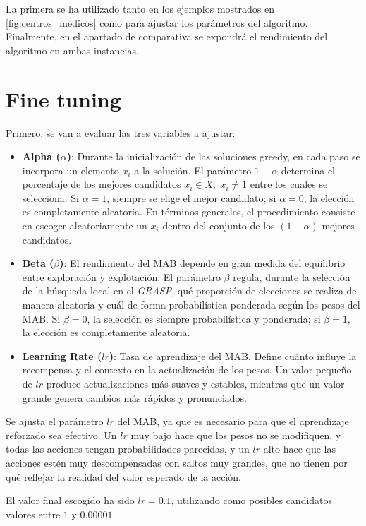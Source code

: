 \documentclass[12pt,a4paper]{book}
\begin{document}
La primera se ha utilizado tanto en los ejemplos mostrados en \ref{fig:centros_medicos} como para ajustar los parámetros del algoritmo. Finalmente, en el apartado de comparativa
se expondrá el rendimiento del algoritmo en ambas instancias.

\section{Fine tuning}

Primero, se van a evaluar las tres variables a ajustar:
\begin{itemize}
    \item \textbf{Alpha ($\alpha$)}: Durante la inicialización de las soluciones greedy, en cada paso se incorpora un elemento $x_i$ a la solución. El parámetro $1-\alpha$ determina el porcentaje de los mejores candidatos $x_i \in X, \; x_i \neq 1$ entre los cuales se selecciona.  
Si $\alpha = 1$, siempre se elige el mejor candidato; si $\alpha = 0$, la elección es completamente aleatoria. En términos generales, el procedimiento consiste en escoger aleatoriamente un $x_i$ dentro del conjunto de los $(1-\alpha)$ mejores candidatos.
    \item \textbf{Beta ($\beta$)}: El rendimiento del MAB depende en gran medida del equilibrio entre exploración y explotación. El parámetro $\beta$ regula, durante la selección de la búsqueda local en el \textit{GRASP}, qué proporción de elecciones se realiza de manera aleatoria y cuál de forma probabilística ponderada según los pesos del MAB.  
Si $\beta = 0$, la selección es siempre probabilística y ponderada; si $\beta = 1$, la elección es completamente aleatoria.
    \item \textbf{Learning Rate ($lr$)}: Tasa de aprendizaje del MAB. Define cuánto influye la recompensa y el contexto en la actualización de los pesos. 
Un valor pequeño de $lr$ produce actualizaciones más suaves y estables, mientras que un valor grande genera cambios más rápidos y pronunciados.
\end{itemize}

Se ajusta el parámetro $lr$ del MAB, ya que es necesario para que el aprendizaje reforzado sea efectivo. Un $lr$ muy bajo hace que los pesos no se modifiquen, y todas las acciones tengan probabilidades parecidas, y un $lr$ alto hace que las acciones estén muy descompensadas con saltos muy grandes, que no tienen por qué reflejar la realidad del valor esperado de la acción.

El valor final escogido ha sido $lr=0.1$, utilizando como posibles candidatos valores entre $1$ y $0.00001$.
\end{document}
